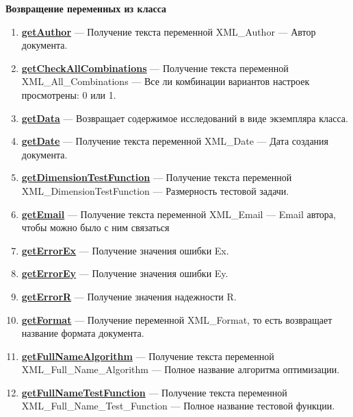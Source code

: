 \documentclass[a4paper,12pt]{article}
\begin{document}
\textbf{Возвращение переменных из класса}
\begin{enumerate}

\item \textbf{\hyperref[getAuthor]{getAuthor}} --- Получение текста переменной XML\_Author --- Автор документа.

\item \textbf{\hyperref[getCheckAllCombinations]{getCheckAllCombinations}} --- Получение текста переменной  XML\_All\_Combinations --- Все ли комбинации вариантов настроек просмотрены: 0 или 1.

\item \textbf{\hyperref[getData]{getData}} --- Возвращает содержимое исследований в виде экземпляра класса.

\item \textbf{\hyperref[getDate]{getDate}} --- Получение текста переменной  XML\_Date --- Дата создания документа.

\item \textbf{\hyperref[getDimensionTestFunction]{getDimensionTestFunction}} --- Получение текста переменной  XML\_DimensionTestFunction --- Размерность тестовой задачи.

\item \textbf{\hyperref[getEmail]{getEmail}} --- Получение текста переменной  XML\_Email --- Email автора, чтобы можно было с ним связаться

\item \textbf{\hyperref[getErrorEx]{getErrorEx}} --- Получение значения ошибки Ex.

\item \textbf{\hyperref[getErrorEy]{getErrorEy}} --- Получение значения ошибки Ey.

\item \textbf{\hyperref[getErrorR]{getErrorR}} --- Получение значения надежности R.

\item \textbf{\hyperref[getFormat]{getFormat}} --- Получение переменной XML\_Format, то есть возвращает название формата документа.

\item \textbf{\hyperref[getFullNameAlgorithm]{getFullNameAlgorithm}} --- Получение текста переменной  XML\_Full\_Name\_Algorithm --- Полное название алгоритма оптимизации.

\item \textbf{\hyperref[getFullNameTestFunction]{getFullNameTestFunction}} --- Получение текста переменной  XML\_Full\_Name\_Test\_Function --- Полное название тестовой функции.


\end{enumerate}
\end{document}

